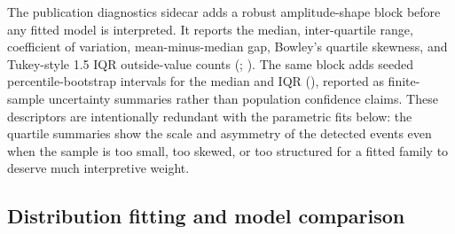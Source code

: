 \documentclass[
]{article}
\begin{document}
The publication diagnostics sidecar adds a robust amplitude-shape block
before any fitted model is interpreted. It reports the median,
inter-quartile range, coefficient of variation, mean-minus-median gap,
Bowley's quartile skewness, and Tukey-style 1.5 IQR outside-value counts
(;
). The same block adds
seeded percentile-bootstrap intervals for the median and IQR
(),
reported as finite-sample uncertainty summaries rather than population
confidence claims. These descriptors are intentionally redundant with
the parametric fits below: the quartile summaries show the scale and
asymmetry of the detected events even when the sample is too small, too
skewed, or too structured for a fitted family to deserve much
interpretive weight.

\subsection{Distribution fitting and model
comparison}\label{distribution-fitting-and-model-comparison}
\end{document}
